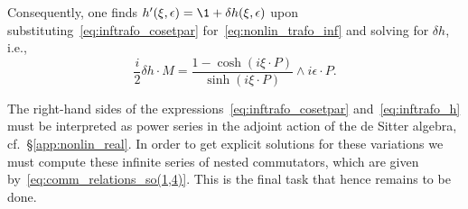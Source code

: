\documentclass[
final,
11pt,
a4paper,
DIV=11,
headinclude=true,
footinclude=false,
bibliography=totoc,
twoside=true,  %
BCOR=5mm
]{scrbook}
\begin{document}
Consequently, one finds $h'(\xi,\epsilon) = \1 + \delta 
h(\xi,\epsilon)$ upon
substituting~\eqref{eq:inftrafo_cosetpar} 
for~\eqref{eq:nonlin_trafo_inf} and solving for $\delta h$, i.e.,
\begin{equation}
\label{eq:inftrafo_h}
  \frac{i}{2}\delta h \cdot M = \frac{1-\cosh(i\xi\cdot 
    P)}{\sinh(i\xi\cdot P)} \wedge i\epsilon\cdot P.
\end{equation}

The right-hand sides of the 
expressions~\eqref{eq:inftrafo_cosetpar} 
and~\eqref{eq:inftrafo_h} must be interpreted as power series in 
the adjoint action of the de Sitter algebra, 
cf.~\S\ref{app:nonlin_real}. In order to get explicit solutions 
for these variations we must compute these infinite series of 
nested commutators, which are given 
by~\eqref{eq:comm_relations_so(1,4)}. This is the final task that 
hence remains to be done.
\end{document}
